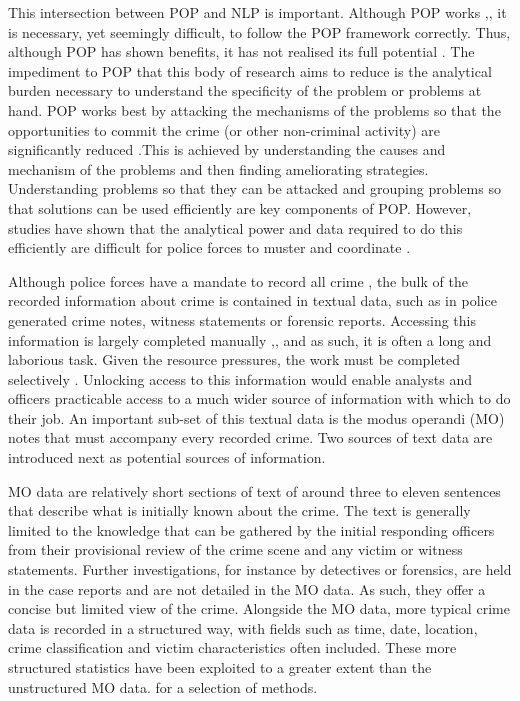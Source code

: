 This intersection between POP and NLP is important. Although POP works \parencite{hinkle2020problem},, it is necessary, yet seemingly difficult, to follow the POP framework correctly. Thus, although POP has shown benefits, it has not realised its full potential \parencite{POPUCL}. The impediment to POP that this body of research aims to reduce is the analytical burden necessary to understand the specificity of the problem or problems at hand. POP works best by attacking the mechanisms of the problems so that the opportunities to commit the crime (or other non-criminal activity) are significantly reduced \parencite{clarke2003becoming}.This is achieved by understanding the causes and mechanism of the problems and then finding ameliorating strategies. Understanding problems so that they can be attacked and grouping problems so that solutions can be used efficiently are key components of POP. However, studies have shown that the analytical power and data required to do this efficiently are difficult for police forces to muster and coordinate \parencite{sidebottom2020implementing}. 

Although police forces have a mandate to record all crime \parencite{home2020crime} , the bulk of the recorded information about crime is contained in textual data, such as in police generated crime notes, witness statements or forensic reports. Accessing this information is largely completed manually \parencite{goldstein1990},, and as such, it is often a long and laborious task. Given the resource pressures, the work must be completed selectively \parencite{rogerson2016utility}. Unlocking access to this information would enable analysts and officers practicable access to a much wider source of information with which to do their job. An important sub-set of this textual data is the modus operandi (MO) notes that must accompany every recorded crime. Two sources of text data are introduced next as potential sources of information.

MO data are relatively short sections of text of around three to eleven sentences that describe what is initially known about the crime. The text is generally limited to the knowledge that can be gathered by the initial responding officers from their provisional review of the crime scene and any victim or witness statements. Further investigations, for instance by detectives or forensics, are held in the case reports and are not detailed in the MO data. As such, they offer a concise but limited view of the crime. Alongside the MO data, more typical crime data is recorded in a structured way, with fields such as time, date, location, crime classification and victim characteristics often included. These more structured statistics have been exploited to a greater extent than the unstructured MO data. \textcite{mapchap10, ratcliffe1998aoristic, braga2014effects, weisel2016analyzing} for a selection of methods.

